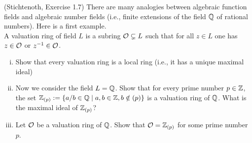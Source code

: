 \begin{exercise}(Stichtenoth, Exercise 1.7)
There are many analogies between algebraic function fields and 
algebraic number fields (i.e., finite extensions of the field 
$\mathbb{Q}$ of rational numbers). Here is a first example. \\

A valuation ring of  field $L$ is a subring $\mathcal{O} \subsetneq L$ 
such that for all $z \in L$ one has $z \in \mathcal{O}$ or $z^{-1} \in \mathcal{O}$.

\begin{enumerate}[(i)]

\item Show that every valuation ring is a local ring 
(i.e., it has a unique maximal ideal)

\item Now we consider the field $L = \mathbb{Q}$. Show that for every 
prime number $p\in \mathbb{Z}$, the set 
$\mathbb{Z}_{(p)} := \lbrace a/b \in \mathbb{Q} \mid a,b \in \mathbb{Z} , b \notin (p) \rbrace $ 
is a valuation ring of $\mathbb{Q}$. What is the maximal ideal of $\mathbb{Z}_{(p)}$?  

\item Let $\mathcal{O}$ be a valuation ring of $\mathbb{Q}$. 
Show that $\mathcal{O} = \mathbb{Z}_{(p)}$ for some prime number $p$.

\end{enumerate}
\end{exercise}

